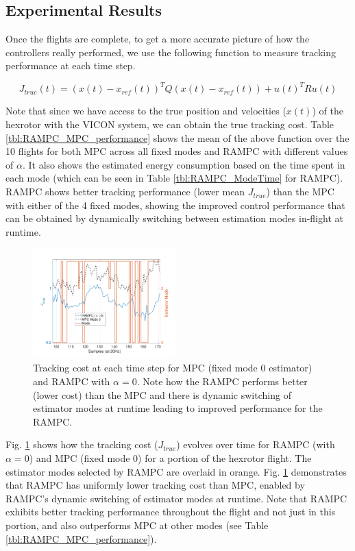 \subsection{Experimental Results}

Once the flights are complete, to get a more accurate picture of how the controllers really performed, we use the following function to measure tracking performance at each time step.

\begin{equation}
	J_{true}(t) =  (x(t)-x_{ref}(t))^{T}Q(x(t)-x_{ref}(t)) + u(t)^{T}Ru(t)
\end{equation}

Note that since we have access to the true position and velocities ($x(t)$) of the hexrotor with the VICON system, we can obtain the true tracking cost. Table \ref{tbl:RAMPC_MPC_performance} shows the mean of the above function over the 10 flights for both MPC across all fixed modes and RAMPC with different values of $\alpha$. It also shows the estimated energy consumption based on the time spent in each mode (which can be seen in Table \ref{tbl:RAMPC_ModeTime} for RAMPC). RAMPC shows better tracking performance (lower mean $J_{true}$) than the MPC with either of the 4 fixed modes, showing the improved control performance that can be obtained by dynamically switching between estimation modes in-flight at runtime. 

\begin{figure}[tb]
	\centering
	\includegraphics[width=0.49\textwidth]{figures/CostAndModes}
	\caption{Tracking cost at each time step for MPC (fixed mode 0 estimator) and RAMPC with $\alpha=0$. Note how the RAMPC performs better (lower cost) than the MPC and there is dynamic switching of estimator modes at runtime leading to improved performance for the RAMPC.}	
	\label{fig:CostAndModes}
\end{figure}


Fig. \ref{fig:CostAndModes} shows how the tracking cost ($J_{true}$) evolves over time for RAMPC (with $\alpha=0$) and MPC (fixed mode 0) for a portion of the hexrotor flight. The estimator modes selected by RAMPC are overlaid in orange. Fig. \ref{fig:CostAndModes} demonstrates that RAMPC has uniformly lower tracking cost than MPC, enabled by RAMPC's dynamic switching of estimator modes at runtime. Note that RAMPC exhibits better tracking performance throughout the flight and not just in this portion, and also outperforms MPC at other modes (see Table \ref{tbl:RAMPC_MPC_performance}).

